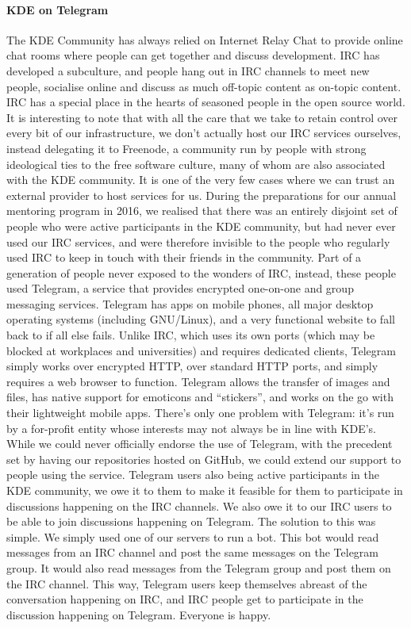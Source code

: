 \paragraph{KDE on Telegram}
The KDE Community has always relied on Internet Relay Chat to provide online chat rooms where people can get together and discuss development. IRC has developed a subculture, and people hang out in IRC channels to meet new people, socialise online and discuss as much off-topic content as on-topic content. IRC has a special place in the hearts of seasoned people in the open source world.
It is interesting to note that with all the care that we take to retain control over every bit of our infrastructure, we don’t actually host our IRC services ourselves, instead delegating it to Freenode, a community run by people with strong ideological ties to the free software culture, many of whom are also associated with the KDE community. It is one of the very few cases where we can trust an external provider to host services for us.
During the preparations for our annual mentoring program in 2016, we realised that there was an entirely disjoint set of people who were active participants in the KDE community, but had never ever used our IRC services, and were therefore invisible to the people who regularly used IRC to keep in touch with their friends in the community.
Part of a generation of people never exposed to the wonders of IRC, instead, these people used Telegram, a service that provides encrypted one-on-one and group messaging services. Telegram has apps on mobile phones, all major desktop operating systems (including GNU/Linux), and a very functional website to fall back to if all else fails. Unlike IRC, which uses its own ports (which may be blocked at workplaces and universities) and requires dedicated clients, Telegram simply works over encrypted HTTP, over standard HTTP ports, and simply requires a web browser to function. Telegram allows the transfer of images and files, has native support for emoticons and “stickers”, and works on the go with their lightweight mobile apps. There’s only one problem with Telegram: it’s run by a for-profit entity whose interests may not always be in line with KDE’s.
While we could never officially endorse the use of Telegram, with the precedent set by having our repositories hosted on GitHub, we could extend our support to people using the service. Telegram users also being active participants in the KDE community, we owe it to them to make it feasible for them to participate in discussions happening on the IRC channels. We also owe it to our IRC users to be able to join discussions happening on Telegram.
The solution to this was simple. We simply used one of our servers to run a bot. This bot would read messages from an IRC channel and post the same messages on the Telegram group. It would also read messages from the Telegram group and post them on the IRC channel. This way, Telegram users keep themselves abreast of the conversation happening on IRC, and IRC people get to participate in the discussion happening on Telegram. Everyone is happy.

